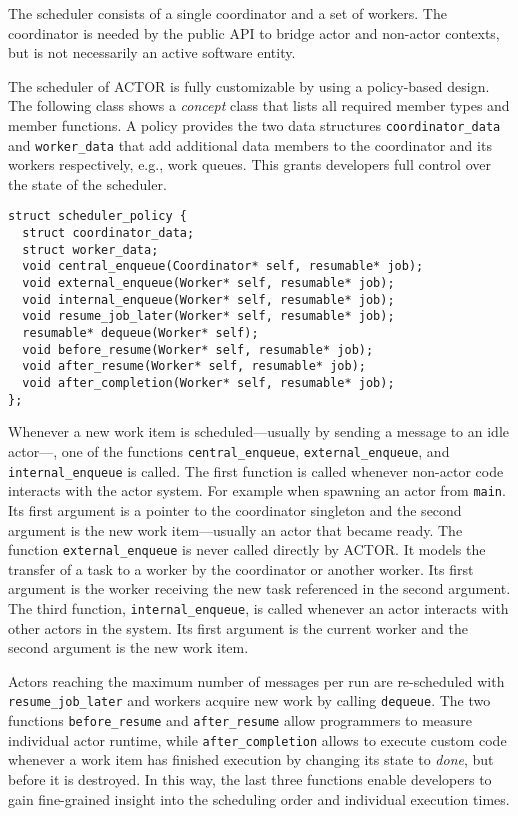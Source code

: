 The scheduler consists of a single coordinator and a set of workers. The
coordinator is needed by the public API to bridge actor and non-actor contexts,
but is not necessarily an active software entity.

The scheduler of ACTOR is fully customizable by using a policy-based design. The
following class shows a \emph{concept} class that lists all required member
types and member functions. A policy provides the two data structures
\lstinline^coordinator_data^ and \lstinline^worker_data^ that add additional
data members to the coordinator and its workers respectively, e.g., work
queues. This grants developers full control over the state of the scheduler.

\begin{lstlisting}
struct scheduler_policy {
  struct coordinator_data;
  struct worker_data;
  void central_enqueue(Coordinator* self, resumable* job);
  void external_enqueue(Worker* self, resumable* job);
  void internal_enqueue(Worker* self, resumable* job);
  void resume_job_later(Worker* self, resumable* job);
  resumable* dequeue(Worker* self);
  void before_resume(Worker* self, resumable* job);
  void after_resume(Worker* self, resumable* job);
  void after_completion(Worker* self, resumable* job);
};
\end{lstlisting}

Whenever a new work item is scheduled---usually by sending a message to an idle
actor---, one of the functions \lstinline^central_enqueue^,
\lstinline^external_enqueue^, and \lstinline^internal_enqueue^ is called. The
first function is called whenever non-actor code interacts with the actor
system. For example when spawning an actor from \lstinline^main^. Its first
argument is a pointer to the coordinator singleton and the second argument is
the new work item---usually an actor that became ready. The function
\lstinline^external_enqueue^ is never called directly by ACTOR. It models the
transfer of a task to a worker by the coordinator or another worker. Its first
argument is the worker receiving the new task referenced in the second
argument. The third function, \lstinline^internal_enqueue^, is called whenever
an actor interacts with other actors in the system. Its first argument is the
current worker and the second argument is the new work item.

Actors reaching the maximum number of messages per run are re-scheduled with
\lstinline^resume_job_later^ and workers acquire new work by calling
\lstinline^dequeue^. The two functions \lstinline^before_resume^ and
\lstinline^after_resume^ allow programmers to measure individual actor runtime,
while \lstinline^after_completion^ allows to execute custom code whenever a
work item has finished execution by changing its state to \emph{done}, but
before it is destroyed. In this way, the last three functions enable developers
to gain fine-grained insight into the scheduling order and individual execution
times.

